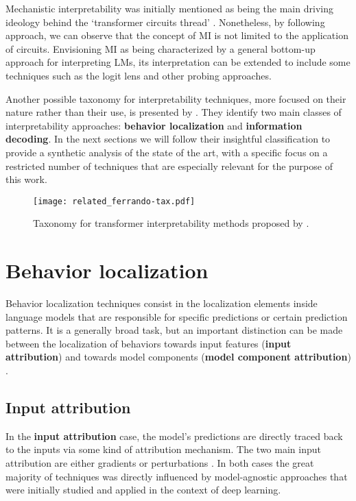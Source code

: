 Mechanistic interpretability was initially mentioned as being the main driving ideology behind the `transformer circuits thread' .
Nonetheless, by following \citet{rai2024} approach, we can observe that the concept of MI is not limited to the application of circuits.
Envisioning MI as being characterized by a general bottom-up approach for interpreting LMs, its interpretation can be extended to include some  techniques such as the logit lens  and other probing approaches.

Another possible taxonomy for interpretability techniques, more focused on their nature rather than their use, is presented by \citet{ferrando2024}.
They identify two main classes of interpretability approaches: \textbf{behavior localization} and \textbf{information decoding}.
In the next sections we will follow their insightful classification to provide a synthetic analysis of the state of the art, with a specific focus on a restricted number of techniques that are especially relevant for the purpose of this work.

\begin{figure}[H]
    \centering
    \texttt{[image: related\_ferrando-tax.pdf]}
    \caption{Taxonomy for transformer interpretability methods proposed by \citet{ferrando2024}.}
    \label{fig:related_ferrando-tax}
\end{figure}

\section{Behavior localization}

Behavior localization techniques consist in the localization elements inside language models that are responsible for specific predictions or certain prediction patterns.
It is a generally broad task, but an important distinction can be made between the localization of behaviors towards input features (\textbf{input attribution}) and towards model components (\textbf{model component attribution}) \cite{ferrando2024}. 

\subsection{Input attribution}

In the \textbf{input attribution} case, the model's predictions are directly traced back to the inputs via some kind of attribution mechanism.
The two main input attribution  are either gradients \cite{denil2014, ding2021, sanyal2021, enguehard2023} or perturbations \cite{li2016, amara2024, mohebbi2023}.
In both cases the great majority of techniques was directly influenced by model-agnostic approaches \cite{sundararajan2017, smilkov2017, ribeiro2016, lundberg2017} that were initially studied and applied in the context of deep learning.


